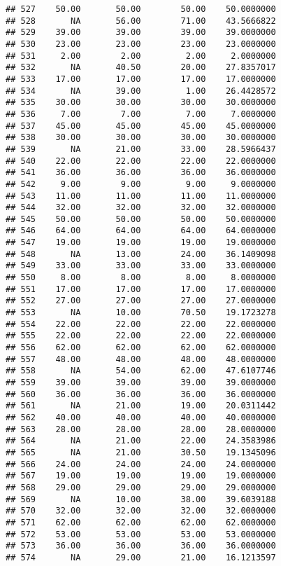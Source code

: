 \documentclass[
]{article}
\begin{document}
\begin{verbatim}
## 527    50.00       50.00        50.00    50.0000000
## 528       NA       56.00        71.00    43.5666822
## 529    39.00       39.00        39.00    39.0000000
## 530    23.00       23.00        23.00    23.0000000
## 531     2.00        2.00         2.00     2.0000000
## 532       NA       40.50        20.00    27.8357017
## 533    17.00       17.00        17.00    17.0000000
## 534       NA       39.00         1.00    26.4428572
## 535    30.00       30.00        30.00    30.0000000
## 536     7.00        7.00         7.00     7.0000000
## 537    45.00       45.00        45.00    45.0000000
## 538    30.00       30.00        30.00    30.0000000
## 539       NA       21.00        33.00    28.5966437
## 540    22.00       22.00        22.00    22.0000000
## 541    36.00       36.00        36.00    36.0000000
## 542     9.00        9.00         9.00     9.0000000
## 543    11.00       11.00        11.00    11.0000000
## 544    32.00       32.00        32.00    32.0000000
## 545    50.00       50.00        50.00    50.0000000
## 546    64.00       64.00        64.00    64.0000000
## 547    19.00       19.00        19.00    19.0000000
## 548       NA       13.00        24.00    36.1409098
## 549    33.00       33.00        33.00    33.0000000
## 550     8.00        8.00         8.00     8.0000000
## 551    17.00       17.00        17.00    17.0000000
## 552    27.00       27.00        27.00    27.0000000
## 553       NA       10.00        70.50    19.1723278
## 554    22.00       22.00        22.00    22.0000000
## 555    22.00       22.00        22.00    22.0000000
## 556    62.00       62.00        62.00    62.0000000
## 557    48.00       48.00        48.00    48.0000000
## 558       NA       54.00        62.00    47.6107746
## 559    39.00       39.00        39.00    39.0000000
## 560    36.00       36.00        36.00    36.0000000
## 561       NA       21.00        19.00    20.0311442
## 562    40.00       40.00        40.00    40.0000000
## 563    28.00       28.00        28.00    28.0000000
## 564       NA       21.00        22.00    24.3583986
## 565       NA       21.00        30.50    19.1345096
## 566    24.00       24.00        24.00    24.0000000
## 567    19.00       19.00        19.00    19.0000000
## 568    29.00       29.00        29.00    29.0000000
## 569       NA       10.00        38.00    39.6039188
## 570    32.00       32.00        32.00    32.0000000
## 571    62.00       62.00        62.00    62.0000000
## 572    53.00       53.00        53.00    53.0000000
## 573    36.00       36.00        36.00    36.0000000
## 574       NA       29.00        21.00    16.1213597

\end{verbatim}
\end{document}
